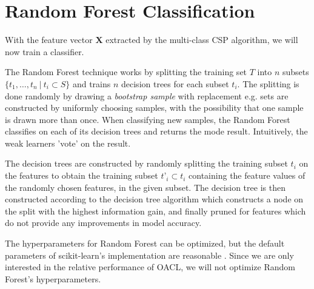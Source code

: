 \section{Random Forest Classification}\label{sec:randomforest}
With the feature vector $\mathbf{X}$ extracted by the multi-class CSP algorithm, we will now train a classifier.

The Random Forest technique works by splitting the training set $T$ into $n$ subsets $\{t_1,…,t_n \ | \ t_i \subset S\}$ and trains $n$ decision trees for each subset $t_i$. The splitting is done randomly by drawing a \emph{bootstrap sample} with replacement e.g. sets are constructed by uniformly choosing samples, with the possibility that one sample is drawn more than once. When classifying new samples, the Random Forest classifies on each of its decision trees and returns the mode result. Intuitively, the weak learners 'vote' on the result.

The decision trees are constructed by randomly splitting the training subset $t_i$ on the features to obtain the training subset $t’_i \subset t_i$ containing the feature values of the randomly chosen features, in the given subset. The decision tree is then constructed according to the decision tree algorithm which constructs a node on the split with the highest information gain, and finally pruned for features which do not provide any improvements in model accuracy.

The hyperparameters for Random Forest can be optimized, but the default parameters of scikit-learn's implementation are reasonable \citep{bernard2009influence}. Since we are only interested in the relative performance of OACL, we will not optimize Random Forest's hyperparameters.